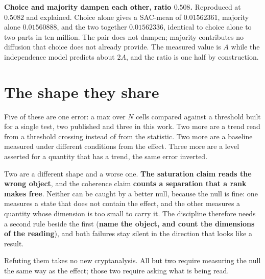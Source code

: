 \textbf{Choice and majority dampen each other, ratio \(0.508\).} Reproduced at \(0.5082\) and explained. Choice alone gives a SAC-mean of \(0.01562361\), majority alone \(0.01560888\), and the two together \(0.01562336\), identical to choice alone to two parts in ten million. The pair does not dampen; majority contributes no diffusion that choice does not already provide. The measured value is \(A\) while the independence model predicts about \(2A\), and the ratio is one half by construction.

\section{The shape they share}

Five of these are one error: a max over \(N\) cells compared against a threshold built for a single test, two published and three in this work. Two more are a trend read from a threshold crossing instead of from the statistic. Two more are a baseline measured under different conditions from the effect. Three more are a level asserted for a quantity that has a trend, the same error inverted.

Two are a different shape and a worse one. \textbf{The saturation claim reads the wrong object}, and the coherence claim \textbf{counts a separation that a rank makes free}. Neither can be caught by a better null, because the null is fine: one measures a state that does not contain the effect, and the other measures a quantity whose dimension is too small to carry it. The discipline therefore needs a second rule beside the first (\textbf{name the object, and count the dimensions of the reading}), and both failures stay silent in the direction that looks like a result.

Refuting them takes no new cryptanalysis. All but two require measuring the null the same way as the effect; those two require asking what is being read.
